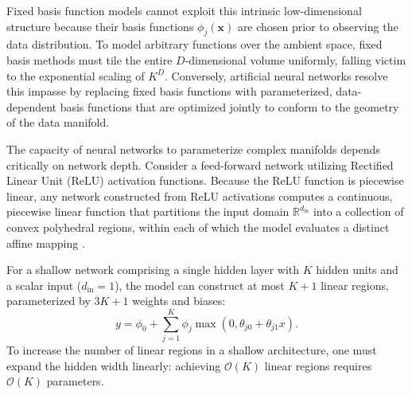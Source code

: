 \documentclass[../../../main.tex]{subfiles}
\begin{document}
Fixed basis function models cannot exploit this intrinsic low-dimensional structure because their basis functions $\phi_j(\mathbf{x})$ are chosen prior to observing the data distribution. To model arbitrary functions over the ambient space, fixed basis methods must tile the entire $D$-dimensional volume uniformly, falling victim to the exponential scaling of $K^D$. Conversely, artificial neural networks resolve this impasse by replacing fixed basis functions with parameterized, data-dependent basis functions that are optimized jointly to conform to the geometry of the data manifold.

The capacity of neural networks to parameterize complex manifolds depends critically on network depth. Consider a feed-forward network utilizing Rectified Linear Unit ($\text{ReLU}$) activation functions. Because the ReLU function is piecewise linear, any network constructed from ReLU activations computes a continuous, piecewise linear function that partitions the input domain $\mathbb{R}^{d_{\text{in}}}$ into a collection of convex polyhedral regions, within each of which the model evaluates a distinct affine mapping \citep{prince2023udl,montufar2014number}.

For a shallow network comprising a single hidden layer with $K$ hidden units and a scalar input ($d_{\text{in}} = 1$), the model can construct at most $K + 1$ linear regions, parameterized by $3K + 1$ weights and biases:
\begin{equation}
y = \phi_0 + \sum_{j=1}^K \phi_j \max\left(0, \theta_{j0} + \theta_{j1}x\right).
\end{equation}
To increase the number of linear regions in a shallow architecture, one must expand the hidden width linearly: achieving $\mathcal{O}(K)$ linear regions requires $\mathcal{O}(K)$ parameters.
\end{document}
